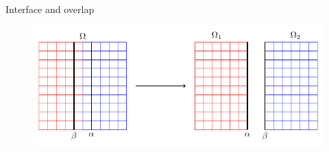 \documentclass{beamer}
\begin{document}
\begin{frame}{Interface and overlap}
\begin{figure}
\includegraphics[width=\textwidth]{AOSM/TIKZ_AOSM_20230614.pdf}
\end{figure}
\end{frame}
\end{document}
